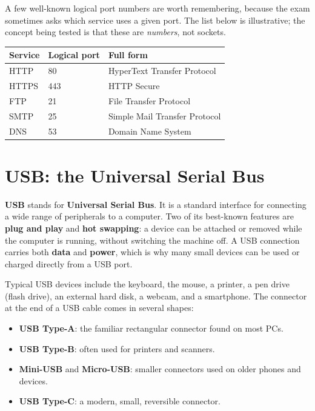 \documentclass[11pt]{article}
\begin{document}
A few well-known logical port numbers are worth remembering, because the exam
sometimes asks which service uses a given port. The list below is
illustrative; the concept being tested is that these are \emph{numbers}, not
sockets.

\begin{center}
\begin{tabular}{p{}p{}p{}}
\toprule
\textbf{Service} & \textbf{Logical port} & \textbf{Full form} \\
\midrule
HTTP & 80 & HyperText Transfer Protocol \\
HTTPS & 443 & HTTP Secure \\
FTP & 21 & File Transfer Protocol \\
SMTP & 25 & Simple Mail Transfer Protocol \\
DNS & 53 & Domain Name System \\
\bottomrule
\end{tabular}
\end{center}

\section{USB: the Universal Serial Bus}
\textbf{USB} stands for \textbf{Universal Serial Bus}. It is a standard
interface for connecting a wide range of peripherals to a computer. Two of
its best-known features are \textbf{plug and play} and \textbf{hot swapping}:
a device can be attached or removed while the computer is running, without
switching the machine off. A USB connection carries both \textbf{data} and
\textbf{power}, which is why many small devices can be used or charged
directly from a USB port.

Typical USB devices include the keyboard, the mouse, a printer, a pen drive
(flash drive), an external hard disk, a webcam, and a smartphone. The
connector at the end of a USB cable comes in several shapes:

\begin{itemize}
  \item \textbf{USB Type-A}: the familiar rectangular connector found on most
    PCs.
  \item \textbf{USB Type-B}: often used for printers and scanners.
  \item \textbf{Mini-USB} and \textbf{Micro-USB}: smaller connectors used on
    older phones and devices.
  \item \textbf{USB Type-C}: a modern, small, reversible connector.
\end{itemize}
\end{document}
